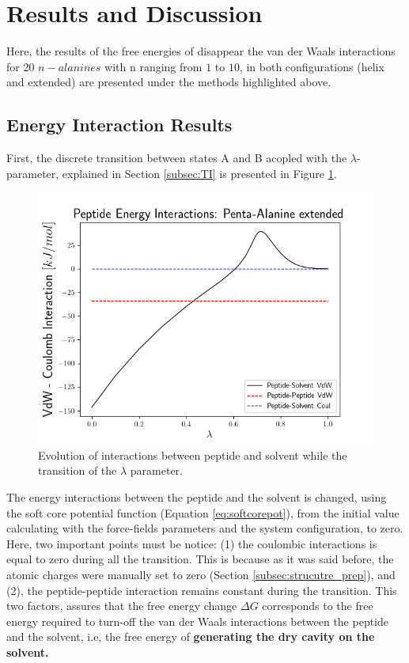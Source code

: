 \section{Results and Discussion}\label{sec:results}

Here, the results of the free energies of disappear the van der Waals interactions for 20 $n-alanines$ with n ranging from $1$ to $10$, in both configurations (helix and extended) are presented under the methods highlighted above.

\subsection{Energy Interaction Results}

First, the discrete transition between states A and B acopled with the $\lambda$-parameter, explained in Section \ref{subsec:TI} is presented in Figure \ref{fig:peptide_interactions}. 

\begin{figure}[h]
    \centering
    \includegraphics[scale=0.8] {Figures/Chapter_6/Interactions.png}
    \caption{Evolution of interactions between peptide and solvent while the transition of the $\lambda$ parameter.}
    \label{fig:peptide_interactions}
\end{figure}

The energy interactions between the peptide and the solvent is changed, using the soft core potential function (Equation \ref{eq:softcorepot}), from the initial value calculating with the force-fields parameters and the system configuration, to zero. Here, two important points must be notice: (1) the coulombic interactions is equal to zero during all the transition. This is because as it was said before, the atomic charges were manually set to zero (Section \ref{subsec:strucutre_prep}), and (2), the peptide-peptide interaction remains constant during the transition. This two factors, assures that the free energy change $\Delta G$ corresponds to the free energy required to turn-off the van der Waals interactions between the peptide and the solvent, i.e, the free energy of \textbf{generating the dry cavity on the solvent.} 

